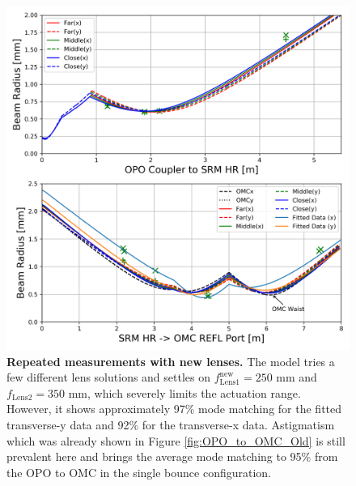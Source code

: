 	\begin{figure}[t!]
	\centering
	\includegraphics[width=0.8 \textwidth]{../Figures/OPO_to_OMCREFL_Newlenses.png}
	\caption[Repeated measurements with new lenses.]  
	{\textbf{Repeated measurements with new lenses.}  The model tries a few different lens solutions and settles on $f^{\text{new}}_{\text{Lens1}} = 250$ mm and $f_{\text{Lens2}} = 350$ mm, which severely limits the actuation range.  However, it shows approximately 97\% mode matching for the fitted transverse-y data and 92\% for the transverse-x data.  Astigmatism which was already shown in Figure \ref{fig:OPO_to_OMC_Old} is still prevalent here and brings the average mode matching to 95\% from the OPO to OMC in the single bounce configuration.
	}
	\label{fig:OPO_to_OMC_New}
	\end{figure}